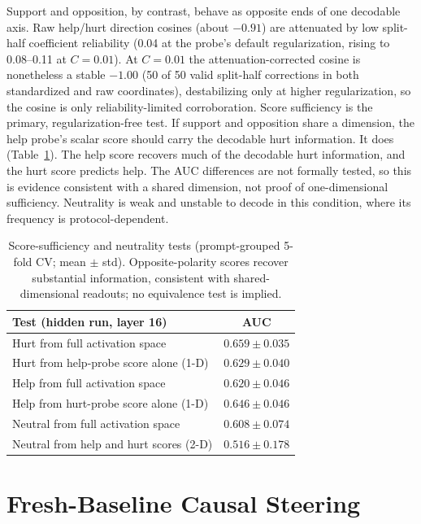 \documentclass[11pt]{article}
\begin{document}
Support and opposition, by contrast, behave as opposite ends of one decodable
axis. Raw help/hurt direction cosines (about $-0.91$) are attenuated by low
split-half coefficient reliability (0.04 at the probe's default regularization,
rising to 0.08--0.11 at $C=0.01$). At $C=0.01$ the attenuation-corrected cosine
is nonetheless a stable $-1.00$ (50 of 50 valid split-half corrections in both
standardized and raw coordinates), destabilizing only at higher regularization,
so the cosine is only reliability-limited corroboration. Score sufficiency is
the primary, regularization-free test. If support and opposition share a dimension, the help
probe's scalar score should carry the decodable hurt information. It does
(Table~\ref{tab:dimensionality}). The help score recovers much of the decodable
hurt information, and the hurt score predicts help. The AUC differences are
not formally tested, so this is evidence consistent with a shared dimension,
not proof of one-dimensional sufficiency. Neutrality is weak and unstable to
decode in this condition, where its frequency is protocol-dependent.

\begin{table}[h]
\centering
\begin{tabular}{lc}
\toprule
Test (hidden run, layer 16) & AUC \\
\midrule
Hurt from full activation space & $0.659\pm0.035$ \\
Hurt from help-probe score alone (1-D) & $0.629\pm0.040$ \\
Help from full activation space & $0.620\pm0.046$ \\
Help from hurt-probe score alone (1-D) & $0.646\pm0.046$ \\
Neutral from full activation space & $0.608\pm0.074$ \\
Neutral from help and hurt scores (2-D) & $0.516\pm0.178$ \\
\bottomrule
\end{tabular}
\caption{Score-sufficiency and neutrality tests (prompt-grouped 5-fold CV;
mean $\pm$ std). Opposite-polarity scores recover substantial information,
consistent with shared-dimensional readouts; no equivalence test is implied.}
\label{tab:dimensionality}
\end{table}

\section{Fresh-Baseline Causal Steering}
\label{sec:steering}
\end{document}
